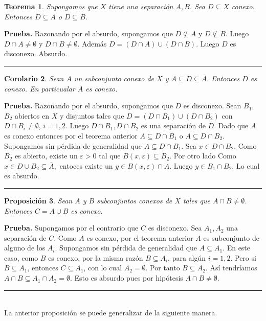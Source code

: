 \documentclass[x11names, 12pt]{book}
\newtheorem{teorema}{Teorema}
\newtheorem{corolario}[teorema] {Corolario}
\newtheorem{proposition}[teorema]{Proposición}
\newenvironment{prueba}[1][Prueba]{\noindent\textbf{#1.} }{\ \rule{0.5em}{0.5em}}
\begin{document}
\begin{teorema}
Supongamos que $X$ tiene una separación $A,B$. Sea $D\subseteq X$ conexo. Entonces $D\subseteq A$ o $D\subseteq B$.
\end{teorema}

\begin{prueba}
Razonando por el absurdo, supongamos que $D \not \subseteq A$ y $D \not \subseteq B$. Luego $D\cap A \neq \emptyset$ y $D\cap B \neq \emptyset$. Además $D=(D\cap A)\cup (D\cap B)$. Luego $D$ es disconexo. Absurdo.
\end{prueba}

\begin{corolario}
Sean $A$ un subconjunto conexo de $X$ y $A\subseteq D \subseteq \overline{A}.$ Entonces $D$ es conexo. En particualar $\overline{A}$ es conexo.
\end{corolario}

\begin{prueba}
Razonando por el absurdo, supongamos que $D $ es disconexo. Sean $B_1$, $B_2$ abiertos en $X$ y disjuntos tales que $D=(D\cap B_1)\cup (D\cap B_2)$ con $D\cap B_i \neq \emptyset$, $i=1,2$. Luego $D\cap B_1, D\cap B_2$ es una separación de $D.$ Dado que $A$ es conexo entonces por el teorema anterior  $A\subseteq D\cap B_1$ o $A\subseteq D\cap B_2$. Supongamos sin pérdida de generalidad que $A\subseteq D\cap B_1$. Sea $x\in D\cap B_2$.  Como $B_2$ es abierto, existe un $\varepsilon >0$ tal que $B(x, \varepsilon) \subseteq B_2 . $ Por otro  lado Como $x \in D \cup B_2 \subseteq \overline{A},$ entoces  existe un $y\in B(x, \varepsilon) \cap A$. Luego $y \in B_1 \cap B_2 .$ Lo cual es    absurdo.
\end{prueba}

\begin{proposition}
Sean $A$ y $B$  subconjuntos conexos de $X$ tales que $A \cap B \neq \emptyset$. Entonces $C=A\cup B $ es conexo.
\end{proposition}
\begin{prueba}
Supongamos por el contrario que $C$ es disconexo. Sea $A_1, A_2$ una separación de $C$.  Como $A$ es conexo, por el teorema anterior $A$ es subconjunto de alguno de los $A_i$. Supongamos sin pérdida de generalidad que $A\subseteq A_1$. En este caso, como $B$ es conexo, por la misma razón  $B \subseteq A_i$, para algún $i=1,2$. Pero si $B\subseteq A_1$, entonces $C\subseteq A_1$, con lo cual $A_2= \emptyset$. Por tanto $B \subseteq A_2.$ Así tendríamos $A\cap B \subseteq A_1 \cap A_2=\emptyset$. Esto es absurdo pues por hipótesis $A\cap B \neq \emptyset.$
\end{prueba}
\\
La anterior proposición se puede generalizar de la siguiente manera.
\end{document}
